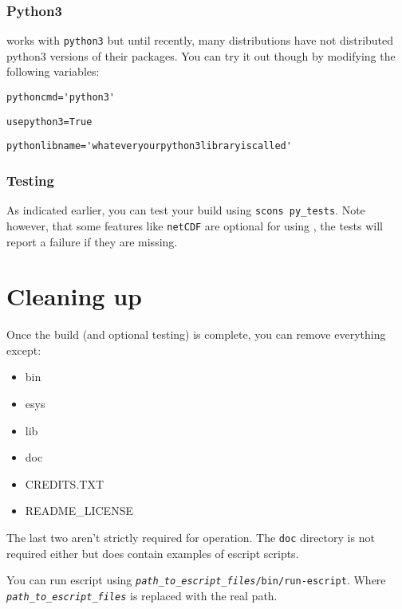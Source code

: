 \subsubsection{Python3}
\escript works with \texttt{python3} but until recently, many distributions have not distributed python3 versions of their packages.
You can try it out though by modifying the following variables:

\begin{verbatim}
pythoncmd='python3'
\end{verbatim}

\begin{verbatim}
usepython3=True
\end{verbatim}

\begin{verbatim}
pythonlibname='whateveryourpython3libraryiscalled'
\end{verbatim}




\subsubsection{Testing}
As indicated earlier, you can test your build using \texttt{scons py_tests}.
Note however, that some features like \texttt{netCDF} are optional for using \escript, the tests will report a failure if
they are missing.

\section{Cleaning up}
\label{sec:cleanup}

Once the build (and optional testing) is complete, you can remove everything except:
\begin{itemize}
 \item bin
 \item esys
 \item lib
 \item doc
 \item CREDITS.TXT
 \item README_LICENSE
\end{itemize}
The last two aren't strictly required for operation.
The \texttt{doc} directory is not required either but does contain examples of escript scripts.

You can run escript using \texttt{\textit{path_to_escript_files}/bin/run-escript}.
Where \texttt{\textit{path_to_escript_files}} is replaced with the real path.

